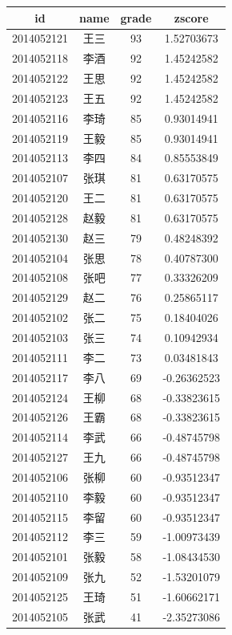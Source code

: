\documentclass[hyperref,adobefonts]{ctexart}
\begin{document}
\begin{longtable}{c|c|c|c}
\hline
id & name & grade & zscore\\
\hline
2014052121 & 王三 & 93 & 1.52703673\\
\hline
2014052118 & 李酒 & 92 & 1.45242582\\
\hline
2014052122 & 王思 & 92 & 1.45242582\\
\hline
2014052123 & 王五 & 92 & 1.45242582\\
\hline
2014052116 & 李琦 & 85 & 0.93014941\\
\hline
2014052119 & 王毅 & 85 & 0.93014941\\
\hline
2014052113 & 李四 & 84 & 0.85553849\\
\hline
2014052107 & 张琪 & 81 & 0.63170575\\
\hline
2014052120 & 王二 & 81 & 0.63170575\\
\hline
2014052128 & 赵毅 & 81 & 0.63170575\\
\hline
2014052130 & 赵三 & 79 & 0.48248392\\
\hline
2014052104 & 张思 & 78 & 0.40787300\\
\hline
2014052108 & 张吧 & 77 & 0.33326209\\
\hline
2014052129 & 赵二 & 76 & 0.25865117\\
\hline
2014052102 & 张二 & 75 & 0.18404026\\
\hline
2014052103 & 张三 & 74 & 0.10942934\\
\hline
2014052111 & 李二 & 73 & 0.03481843\\
\hline
2014052117 & 李八 & 69 & -0.26362523\\
\hline
2014052124 & 王柳 & 68 & -0.33823615\\
\hline
2014052126 & 王霸 & 68 & -0.33823615\\
\hline
2014052114 & 李武 & 66 & -0.48745798\\
\hline
2014052127 & 王九 & 66 & -0.48745798\\
\hline
2014052106 & 张柳 & 60 & -0.93512347\\
\hline
2014052110 & 李毅 & 60 & -0.93512347\\
\hline
2014052115 & 李留 & 60 & -0.93512347\\
\hline
2014052112 & 李三 & 59 & -1.00973439\\
\hline
2014052101 & 张毅 & 58 & -1.08434530\\
\hline
2014052109 & 张九 & 52 & -1.53201079\\
\hline
2014052125 & 王琦 & 51 & -1.60662171\\
\hline
2014052105 & 张武 & 41 & -2.35273086\\
\hline
\end{longtable}
\end{document}

